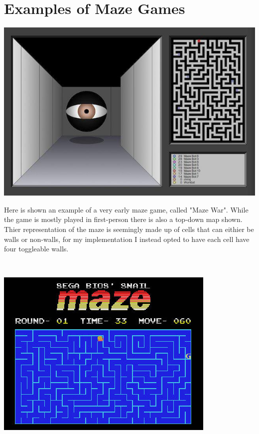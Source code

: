 \documentclass{article}
\begin{document}
\section{Examples of Maze Games}
\begin{minipage}{0.4\textwidth}
\includegraphics[scale=0.3]{example of old maze}
\end{minipage}
\begin{minipage}{0.5\textwidth}\raggedright
Here is shown an example of a very early maze game, called "Maze War". While the game is mostly played in first-person there is also a top-down map
shown. Thier representation of the maze is seemingly made up of cells that can eithier be walls or non-walls, for my implementation I instead opted to
have each cell have four toggleable walls. 
\end{minipage}
\linebreak
\\
\linebreak
\begin{minipage}{0.4\textwidth}
\includegraphics[scale=0.48]{better example}
\end{minipage}
\end{document}
